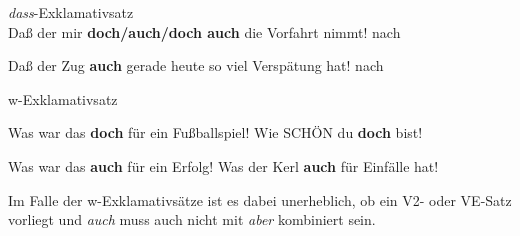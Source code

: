{\begin{exe}
	\ex\label{865} \textit{dass}-Exklamativsatz\\
	Daß der mir \textbf{doch/auch/doch auch} die Vorfahrt nimmt!  
	\newline
	\hbox{}\hfill\hbox {nach \citet[152]{Zaefferer1988}}
\end{exe} 
\vspace{-0.5cm}
\begin{exe}
	\ex\label{866} 
	Daß der Zug \textbf{auch} gerade heute so viel Verspätung hat!
	\newline
	\hbox{}\hfill\hbox {nach \citet[90]{Helbig1990}}
\end{exe} 	

\begin{exe}
	\ex\label{867}w-Exklamativsatz\\[-1.25em]
		\begin{xlist}	
			\ex\label{867a} Was war das \textbf{doch} für ein Fußballspiel!	
			\hfill\hbox {\citet[116]{Helbig1990}}
	 		\ex\label{867b} Wie SCHÖN du \textbf{doch} bist!		
	 		\hfill\hbox {\citet[218-219]{Rinas2006}}
		\end{xlist}
\end{exe}

\begin{exe}
	\ex\label{868}
		\begin{xlist}	
			\ex\label{868a} Was war das \textbf{auch} für ein Erfolg!
			\hfill\hbox {\citet[90]{Helbig1990}}
	 		\ex\label{868b} Was der Kerl \textbf{auch} für Einfälle hat!		
	 		\hfill\hbox {\citet[177]{Schubiger1977}}
		\end{xlist}
\end{exe}	
Im Falle der w-Exklamativsätze ist es dabei unerheblich, ob ein V2- oder VE-Satz vorliegt und \textit{auch} muss auch nicht mit \textit{aber} kombiniert sein.

}
